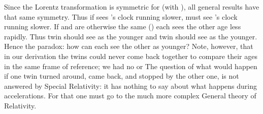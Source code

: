 {
Since the Lorentz transformation is symmetric for  \m{\leftrightarrow} 
(with ), all general results have that
same symmetry.
Thus if  sees 's clock running slower,  must see 's clock running
slower.
If  and  are otherwise the same () each sees the other age less
rapidly.
Thus twin  should see  as the younger and twin  should see  as the
younger.
Hence the paradox: how can each see the other as younger?
Note, however, that in our derivation the twins could never come back
together to compare their ages in the same frame of reference; we had no
 or 
The question of what would happen if one twin turned around, came back, and
stopped by the other one, is not answered by Special Relativity: it has
nothing to say about what happens during accelerations.
For that one must go to the much more complex General theory of Relativity.
%
%
}%
%

